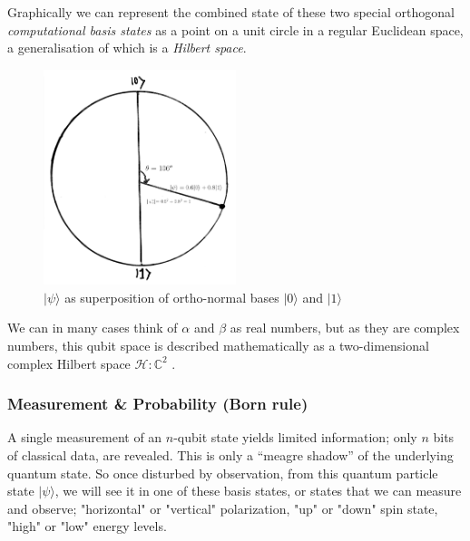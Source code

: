 Graphically we can represent the combined state of these two special orthogonal \emph{computational basis states} 
as a point on a unit circle in a regular Euclidean space, a generalisation of which is a \emph{Hilbert space}.  

\begin{figure}[ht] 
	\begin{adjustbox}{center}
		\includegraphics[width=0.5\textwidth, inner]{figures/unit-vector-2-d-hilbert-state_2.png}
	\end{adjustbox}
	\vspace{4pt}
	\caption{$\lvert\psi\rangle$ as superposition of ortho-normal bases $\lvert0\rangle$ and $\lvert1\rangle$ }
	\label{fig:2d_hilbert_space}
\end{figure}

We can in many cases think of $\alpha$ and $\beta$ as real numbers, but as they are complex numbers, 
this qubit space is described mathematically as a two-dimensional complex 
Hilbert space $\mathcal{H} : \mathbb{C}^2$ \cite{Preskill:2023} \cite{Nielsen:2010}.


\subsubsection{Measurement \& Probability (Born rule)}

A single measurement of an $n$-qubit state yields limited information; only $n$ bits of classical data, 
are revealed. This is only a \enquote{meagre shadow} \cite{Preskill:2023} of the underlying quantum state.
So once disturbed by observation, from this quantum particle state $\lvert\psi\rangle$,
we will see it in one of these basis states, or states that we can measure and observe; 
"horizontal" or "vertical" polarization, "up" or "down" spin state, "high" or "low" energy levels.  

